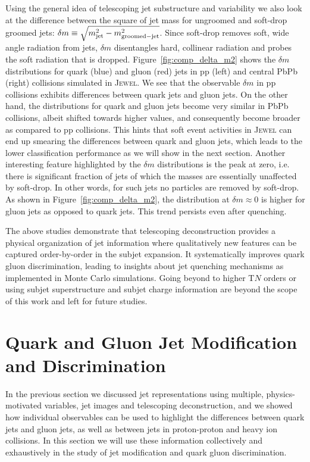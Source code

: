 \documentclass[notoc,preprintnumbers]{JHEP3}
\begin{document}
Using the general idea of telescoping jet substructure and variability \cite{Chien:2017xrb} we also look at the difference between the square of jet mass for ungroomed and soft-drop groomed jets: $\delta m \equiv \sqrt{m_{\rm jet}^2-m_{\rm groomed-jet}^2}$. Since soft-drop removes soft, wide angle radiation from jets, $\delta m$ disentangles hard, collinear radiation and probes the soft radiation that is dropped. Figure~\ref{fig:comp_delta_m2} shows the $\delta m$ distributions for quark (blue) and gluon (red) jets in pp (left) and central PbPb (right) collisions simulated in \textsc{Jewel}. We see that the observable $\delta m$ in pp collisions exhibits differences between quark jets and gluon jets. %
On the other hand, the distributions for quark and gluon jets become very similar in PbPb collisions, albeit shifted towards higher values, and consequently become broader as compared to pp collisions. This hints that soft event activities in \textsc{Jewel} can end up smearing the differences between quark and gluon jets, which leads to the lower classification performance as we will show in the next section. Another interesting feature highlighted by the $\delta m$ distributions is the peak at zero, i.e. there is significant fraction of jets of which the masses are essentially unaffected by soft-drop. In other words, for such jets no particles are removed by soft-drop. As shown in Figure~\ref{fig:comp_delta_m2}, the distribution at $\delta m \approx 0$ is higher for gluon jets as opposed to quark jets. This trend persists even after quenching.

The above studies demonstrate that telescoping deconstruction provides a physical organization of jet information where qualitatively new features can be captured order-by-order in the subjet expansion. It systematically improves quark gluon discrimination, leading to insights about jet quenching mechanisms as implemented in Monte Carlo simulations. Going beyond to higher T$N$ orders or using subjet superstructure \cite{Gallicchio:2010sw} and subjet charge \cite{Krohn:2012fg} information are beyond the scope of this work and left for future studies.

\section{Quark and Gluon Jet Modification and Discrimination}
\label{sec:results}

In the previous section we discussed jet representations using multiple, physics-motivated variables, jet images and telescoping deconstruction, and we showed how individual observables can be used to highlight the differences between quark jets and gluon jets, as well as between jets in proton-proton and heavy ion collisions. In this section we will use these information collectively and exhaustively in the study of jet modification and quark gluon discrimination.
\end{document}
